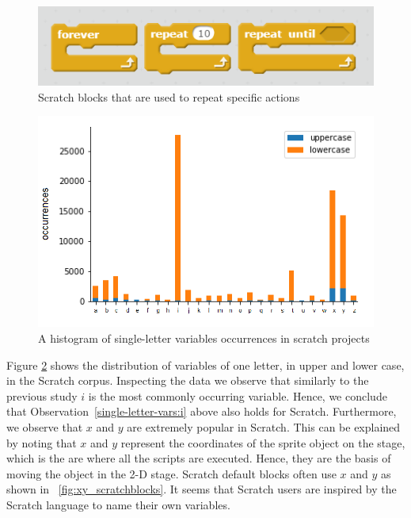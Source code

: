 \documentclass[conference]{IEEEtran}
\begin{document}
\begin{figure}[h]
	\begin{center}
		\includegraphics[width=\columnwidth]{fig/loops_in_scratch}
		\caption{Scratch blocks that are used to repeat specific actions}
		\label{fig:loop_scratchblocks}
	\end{center}
\end{figure} 

\begin{figure}[h]
	\begin{center}
		\includegraphics[width=\columnwidth]{fig/varname_singleletter-occurrences}
		\caption{A histogram of single-letter variables occurrences in scratch projects }
		\label{fig:one_letter_occurrence}
	\end{center}
\end{figure} 
Figure \ref{fig:one_letter_occurrence} shows the distribution of variables of one letter, in upper and lower case, in the Scratch corpus. 
Inspecting the data we observe that similarly to the previous study $i$ is the most commonly occurring variable. Hence, we conclude that Observation~\ref{single-letter-vars:i} above also holds for Scratch. Furthermore, we observe that $x$ and $y$ are extremely popular in Scratch. This can be explained by noting that $x$ and $y$ represent the coordinates of the sprite object on the stage, which is the are where all the scripts are executed. Hence, they are the basis of moving the object in the 2-D stage. Scratch default blocks often use $x$ and $y$ as shown in \figurename{~\ref{fig:xy_scratchblocks}}. It seems that Scratch users are inspired by the Scratch language to name their own variables. 
\end{document}
